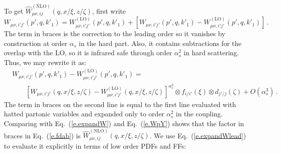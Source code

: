 \documentclass[prd,preprintnumbers,nofootinbib,superscriptaddress,onecolumn,preprint]{revtex4-1}
\newcommand\3[1]{\boldsymbol{#1}}
\newcommand{\eref}[1]{Eq.~(\ref{e.#1})}
\begin{document}
To get $\hat{W}^{(\text{NLO})}_{\mu \nu, ij}(q,x/\xi,z/\zeta)$, first write
%
\begin{equation}
W_{\mu \nu,i'j'}(p',q,k'_1) =  W^{(\text{LO})}_{\mu \nu,i'j'}(p',q,k'_1) 
+ \left[ W_{\mu \nu,i'j'}(p',q,k'_1)  
- W^{(\text{LO})}_{\mu \nu,i'j'}(p',q,k'_1) \right] \, . 
\label{e.WpY}
\end{equation}
%
The term in braces is the correction to the leading order so it
vanishes by construction at order $\alpha_s$ in the hard part. Also,
it contains subtractions for the overlap with the $\text{LO}$, so it
is infrared safe through order $\alpha_s^2$ in hard scattering. Thus,
we may rewrite it as:
%
\begin{align}
&{} W_{\mu \nu,i'j'}(p',q,k'_1)  - W^{(\text{LO})}_{\mu \nu,i'j'}(p',q,k'_1)  = \nonumber \\
&{} \qquad \left[ W_{\mu \nu,i'j'}(q,x/\xi,z/\zeta)  
- W^{(\text{LO})}_{\mu \nu,i'j'}(q,x/\xi,z/\zeta) 
\right]^{\alpha_s^2} 
\otimes f_{i/i'}(\xi) \otimes d_{j'/j}(\zeta) 
+ O(\alpha_s^3) \, . 
\label{e.fdab}
\end{align}
%
The term in braces on the second line is equal to the first line
evaluated with hatted partonic variables and expanded only to order
$\alpha_s^2$ in the coupling. Comparing with \eref{expandW} and
\eref{WpY} shows that the factor in braces in \eref{fdab} is
$\hat{W}^{(\text{NLO})}_{\mu \nu, ij}(q,x/\xi,z/\zeta)$.  We use
\eref{expandWlead} to evaluate it explicitly in terms of low order
PDFs and FFs:
%
\end{document}
